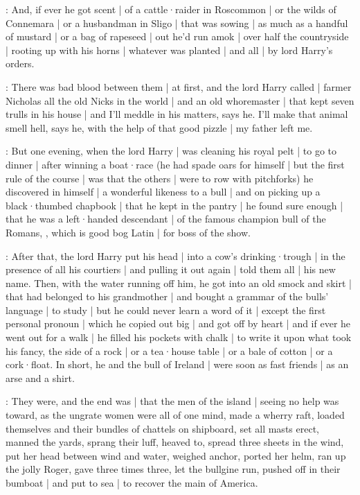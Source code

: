 \dixon:
And,
if ever he got scent |
of a cattle·raider in Roscommon |
or the wilds of Connemara |
or a husbandman in Sligo |
that was sowing |
as much as a handful of mustard |
or a bag of rapeseed |
out he'd run amok |
over half the countryside |
rooting up with his horns |
whatever was planted |
and all |
by lord Harry's orders.

\lynch:
There was bad blood between them |
at first,
and the lord Harry called |
farmer Nicholas all the old Nicks in the world |
and an old whoremaster |
that kept seven trulls in his house |
and I'll meddle in his matters,
says he.
I'll make that animal smell hell,
says he,
with the help of that good pizzle |
my father left me.

\dixon:
But one evening,
when the lord Harry |
was cleaning his royal pelt |
to go to dinner |
after winning a boat·race
(he had spade oars for himself |
but the first rule of the course |
was that the others |
were to row with pitchforks)
he discovered in himself |
a wonderful likeness to a bull |
and on picking up a black·thumbed chapbook |
that he kept in the pantry |
he found sure enough |
that he was a left·handed descendant |
of the famous champion bull of the Romans,
,
which is good bog Latin |
for boss of the show.

\lynch:
After that,
the lord Harry put his head |
into a cow's drinking·trough |
in the presence of all his courtiers |
and pulling it out again |
told them all |
his new name.
Then,
with the water running off him,
he got into an old smock and skirt |
that had belonged to his grandmother |
and bought a grammar of the bulls' language |
to study |
but he could never learn a word of it |
except the first personal pronoun |
which he copied out big |
and got off by heart |
and if ever he went out for a walk |
he filled his pockets with chalk |
to write it upon what took his fancy,
the side of a rock |
or a tea·house table |
or a bale of cotton |
or a cork·float.
In short,
he and the bull of Ireland |
were soon as fast friends |
as an arse and a shirt.

\stephen:
They were,
and the end was |
that the men of the island |
seeing no help was toward,
as the ungrate women were all of one mind,
made a wherry raft,
loaded themselves and their bundles of chattels on shipboard,
set all masts erect,
manned the yards,
sprang their luff,
heaved to,
spread three sheets in the wind,
put her head between wind and water,
weighed anchor,
ported her helm,
ran up the jolly Roger,
gave three times three,
let the bullgine run,
pushed off in their bumboat |
and put to sea |
to recover the main of America.

